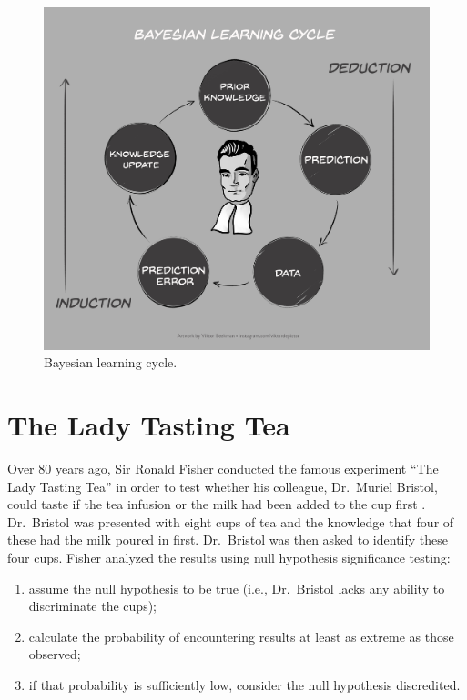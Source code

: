 \documentclass[
]{book}
\providecommand{\tightlist}{%
  \setlength{\itemsep}{0pt}\setlength{\parskip}{0pt}}
\begin{document}
\begin{figure}

{\centering \includegraphics[width=1\linewidth]{Figures/BayesianLearningCycle} 

}

\caption{Bayesian learning cycle. }\label{fig:bayesian-learning-cycle}
\end{figure}

\hypertarget{the-lady-tasting-tea}{%
\chapter{The Lady Tasting Tea}\label{the-lady-tasting-tea}}

Over 80 years ago, Sir Ronald Fisher conducted the famous experiment ``The Lady Tasting Tea'' in order to test whether his colleague, Dr.~Muriel Bristol, could taste if the tea infusion or the milk had been added to the cup first \citep[p11]{fisher1937design}. Dr.~Bristol was presented with eight cups of tea and the knowledge that four of these had the milk poured in first. Dr.~Bristol was then asked to identify these four cups.
Fisher analyzed the results using null hypothesis significance testing:

\begin{enumerate}
\def\labelenumi{\arabic{enumi}.}
\tightlist
\item
  assume the null hypothesis to be true (i.e., Dr.~Bristol lacks any ability to discriminate the cups);
\item
  calculate the probability of encountering results at least as extreme as those observed;
\item
  if that probability is sufficiently low, consider the null hypothesis discredited.
\end{enumerate}
\end{document}
